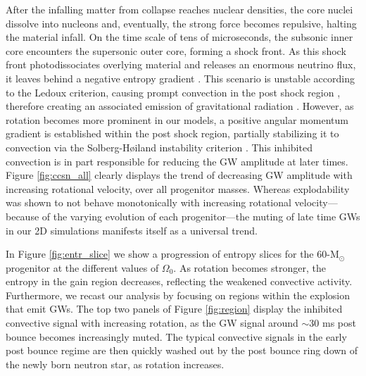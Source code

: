 \documentclass[twocolumn,times]{aastex62}  %
\newcommand{\Msun}{\ensuremath{\mathrm{M}_\odot}\xspace}
\begin{document}
After the infalling matter from collapse reaches nuclear densities, the core nuclei dissolve into nucleons and, eventually, the strong force becomes repulsive, halting the material infall.  On the time scale of tens of microseconds, the subsonic inner core encounters the supersonic outer core, forming a shock front.  As this shock front photodissociates overlying material and releases an enormous neutrino flux, it leaves behind a negative entropy gradient \citep{mazurek:1982,bruenn:1985,bruenn:1989}.  This scenario is unstable according to the Ledoux criterion, causing prompt convection in the post shock region \citep{burrows:1992}, therefore creating an associated emission of gravitational radiation \citep{marek:2009b,ott:2009}.  However, as rotation becomes more prominent in our models, a positive angular momentum gradient is established within the post shock region, partially stabilizing it to convection via the Solberg-H{\o}iland instability criterion \citep{endal:1978,fryer:2000}.  This inhibited convection is in part responsible for reducing the GW amplitude at later times.  Figure \ref{fig:ccsn_all} clearly displays the trend of decreasing GW amplitude with increasing rotational velocity, over all progenitor masses.  Whereas explodability was shown to not behave monotonically with increasing rotational velocity---because of the varying evolution of each progenitor---the muting of late time GWs in our 2D simulations manifests itself as a universal trend.
 
In Figure \ref{fig:entr_slice} we show a progression of entropy slices  for the 60-\Msun progenitor at the different values of $\Omega_0$.  As rotation becomes stronger, the entropy in the gain region decreases, reflecting the weakened convective activity.  Furthermore, we recast our analysis by focusing on regions within the explosion that emit GWs.  The top two panels of Figure \ref{fig:region} display the inhibited convective signal with increasing rotation, as the GW signal around $\sim$30 ms post bounce becomes increasingly muted.  The typical convective signals in the early post bounce regime are then quickly washed out by the post bounce ring down of the newly born neutron star, as rotation increases.
\end{document}
